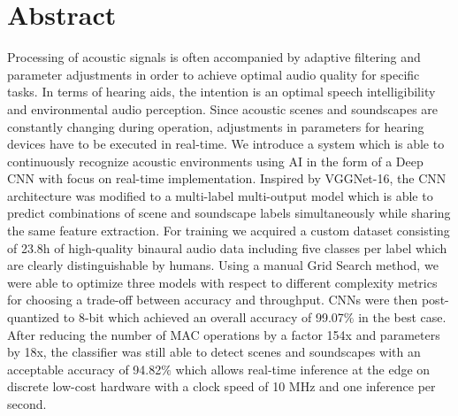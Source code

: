 \section*{Abstract}



Processing of acoustic signals is often accompanied by adaptive filtering and parameter adjustments in order to achieve optimal audio quality for specific tasks. In terms of hearing aids, the intention is an optimal speech intelligibility and environmental audio perception. Since acoustic scenes and soundscapes are constantly changing during operation, adjustments in  parameters for hearing devices have to be executed in real-time. We introduce a system which is able to continuously recognize acoustic environments using \ac{AI} in the form of a Deep \ac{CNN} with focus on real-time implementation. Inspired by VGGNet-16, the \ac{CNN} architecture was modified to a multi-label multi-output model which is able to predict combinations of scene and soundscape labels simultaneously while sharing the same feature extraction. For training we acquired a custom dataset consisting of 23.8h of high-quality binaural audio data including five classes per label which are clearly distinguishable by humans. Using a manual Grid Search method, we were able to optimize three models with respect to different complexity metrics for choosing a trade-off between accuracy and throughput. \acp{CNN} were then post-quantized to 8-bit which achieved an overall accuracy of 99.07$\%$ in the best case. After reducing the number of \ac{MAC} operations by a factor 154x and parameters by 18x, the classifier was still able to detect scenes and soundscapes with an acceptable accuracy of 94.82$\%$ which allows real-time inference at the edge on discrete low-cost hardware with a clock speed of 10 MHz and one inference per second.